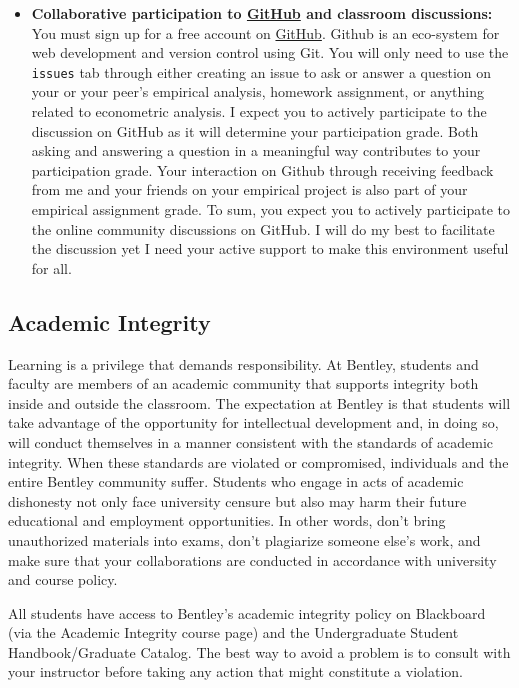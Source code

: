 \documentclass[
]{book}
\begin{document}
\begin{itemize}
\begin{itemize}
  \item
    \textbf{Collaborative participation to \href{https://github.com/}{GitHub} and classroom discussions:} You must sign up for a free account on \href{https://github.com/}{GitHub}. Github is an eco-system for web development and version control using Git. You will only need to use the \texttt{issues} tab through either creating an issue to ask or answer a question on your or your peer's empirical analysis, homework assignment, or anything related to econometric analysis. I expect you to actively participate to the discussion on GitHub as it will determine your participation grade. Both asking and answering a question in a meaningful way contributes to your participation grade. Your interaction on Github through receiving feedback from me and your friends on your empirical project is also part of your empirical assignment grade. To sum, you expect you to actively participate to the online community discussions on GitHub. I will do my best to facilitate the discussion yet I need your active support to make this environment useful for all.
  \end{itemize}
\end{itemize}

\hypertarget{academic-integrity}{%
\subsection*{Academic Integrity}\label{academic-integrity}}

Learning is a privilege that demands responsibility. At Bentley, students and faculty are members of an academic community that supports integrity both inside and outside the classroom. The expectation at Bentley is that students will take advantage of the opportunity for intellectual development and, in doing so, will conduct themselves in a manner consistent with the standards of academic integrity. When these standards are violated or compromised, individuals and the entire Bentley community suffer. Students who engage in acts of academic dishonesty not only face university censure but also may harm their future educational and employment opportunities. In other words, don't bring unauthorized materials into exams, don't plagiarize someone else's work, and make sure that your collaborations are conducted in accordance with university and course policy.

All students have access to Bentley's academic integrity policy on Blackboard (via the Academic Integrity course page) and the Undergraduate Student Handbook/Graduate Catalog. The best way to avoid a problem is to consult with your instructor before taking any action that might constitute a violation.
\end{document}
